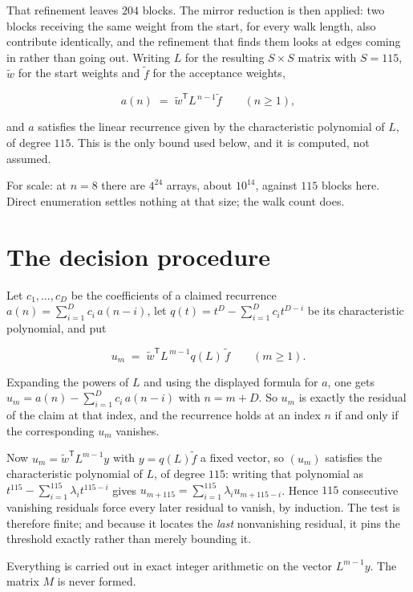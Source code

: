\documentclass[11pt]{article}
\theoremstyle{definition}
\begin{document}
That refinement leaves $204$ blocks. The mirror reduction is then applied: two blocks receiving the same weight from the start, for every walk length, also contribute identically, and the refinement that finds them looks at edges coming in rather than going out. Writing $L$ for the resulting $S \times S$ matrix with $S = 115$, $\tilde w$ for the start weights and $\tilde f$ for the acceptance weights,

\[a(n) \;=\; \tilde w^{\mathsf T} L^{\,n-1} \tilde f \qquad (n \ge 1),\]

and $a$ satisfies the linear recurrence given by the characteristic polynomial of $L$, of degree $115$. This is the only bound used below, and it is computed, not assumed.

For scale: at $n = 8$ there are $4^{24}$ arrays, about $10^{14}$, against $115$ blocks here. Direct enumeration settles nothing at that size; the walk count does.

\section{The decision procedure}

Let $c_1,\dots,c_D$ be the coefficients of a claimed recurrence $a(n) = \sum_{i=1}^{D} c_i\,a(n-i)$, let $q(t) = t^{D} - \sum_{i=1}^{D} c_i t^{D-i}$ be its characteristic polynomial, and put

\[u_m \;=\; \tilde w^{\mathsf T} L^{\,m-1} q(L)\,\tilde f \qquad (m \ge 1).\]

Expanding the powers of $L$ and using the displayed formula for $a$, one gets $u_m = a(n) - \sum_{i=1}^{D} c_i\,a(n-i)$ with $n = m + D$. So $u_m$ is exactly the residual of the claim at that index, and the recurrence holds at an index $n$ if and only if the corresponding $u_m$ vanishes.

Now $u_m = \tilde w^{\mathsf T} L^{m-1} y$ with $y = q(L)\tilde f$ a fixed vector, so $(u_m)$ satisfies the characteristic polynomial of $L$, of degree $115$: writing that polynomial as $t^{115} - \sum_{i=1}^{115} \lambda_i t^{115-i}$ gives $u_{m+115} = \sum_{i=1}^{115} \lambda_i u_{m+115-i}$. Hence $115$ consecutive vanishing residuals force every later residual to vanish, by induction. The test is therefore finite; and because it locates the {\itshape last} nonvanishing residual, it pins the threshold exactly rather than merely bounding it.

Everything is carried out in exact integer arithmetic on the vector $L^{m-1}y$. The matrix $M$ is never formed.
\end{document}
